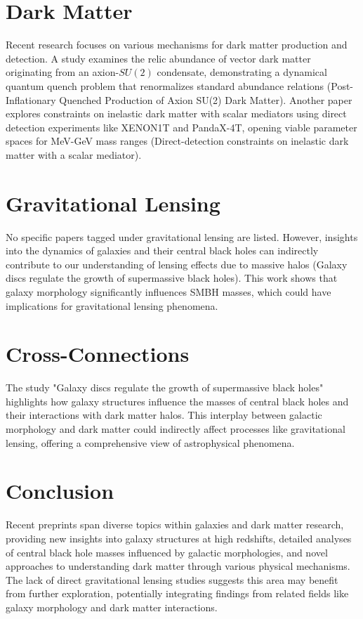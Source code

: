 \documentclass[11pt]{article}
\begin{document}
\section*{Dark Matter}
Recent research focuses on various mechanisms for dark matter production and detection. A study examines the relic abundance of vector dark matter originating from an axion-$SU(2)$ condensate, demonstrating a dynamical quantum quench problem that renormalizes standard abundance relations (Post-Inflationary Quenched Production of Axion SU(2) Dark Matter). Another paper explores constraints on inelastic dark matter with scalar mediators using direct detection experiments like XENON1T and PandaX-4T, opening viable parameter spaces for MeV-GeV mass ranges (Direct-detection constraints on inelastic dark matter with a scalar mediator).
\section*{Gravitational Lensing}
No specific papers tagged under gravitational lensing are listed. However, insights into the dynamics of galaxies and their central black holes can indirectly contribute to our understanding of lensing effects due to massive halos (Galaxy discs regulate the growth of supermassive black holes). This work shows that galaxy morphology significantly influences SMBH masses, which could have implications for gravitational lensing phenomena.
\section*{Cross-Connections}
The study "Galaxy discs regulate the growth of supermassive black holes" highlights how galaxy structures influence the masses of central black holes and their interactions with dark matter halos. This interplay between galactic morphology and dark matter could indirectly affect processes like gravitational lensing, offering a comprehensive view of astrophysical phenomena.
\section*{Conclusion}
Recent preprints span diverse topics within galaxies and dark matter research, providing new insights into galaxy structures at high redshifts, detailed analyses of central black hole masses influenced by galactic morphologies, and novel approaches to understanding dark matter through various physical mechanisms. The lack of direct gravitational lensing studies suggests this area may benefit from further exploration, potentially integrating findings from related fields like galaxy morphology and dark matter interactions.
\newpage
\end{document}
